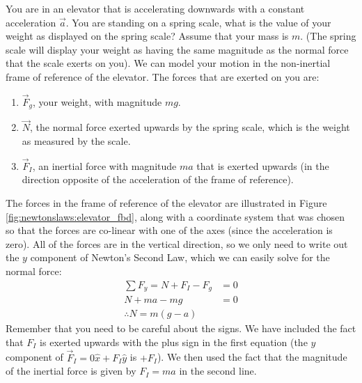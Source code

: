 \begin{example}{You are in an elevator that is accelerating downwards with a constant acceleration $\vec a$. You are standing on a spring scale, what is the value of your weight as displayed on the spring scale? Assume that your mass is $m$. (The spring scale will display your weight as having the same magnitude as the normal force that the scale exerts on you). }
We can model your motion in the non-inertial frame of reference of the elevator. The forces that are exerted on you are:
\begin{enumerate}
\item $\vec F_g$, your weight, with magnitude $mg$.
\item $\vec N$, the normal force exerted upwards by the spring scale, which is the weight as measured by the scale.
\item $\vec F_I$, an inertial force with magnitude $ma$ that is exerted upwards (in the direction opposite of the acceleration of the frame of reference).
\end{enumerate}
The forces in the frame of reference of the elevator are illustrated in Figure \ref{fig:newtonslaws:elevator_fbd}, along with a coordinate system that was chosen so that the forces are co-linear with one of the axes (since the acceleration is zero).
All of the forces are in the vertical direction, so we only need to write out the $y$ component of Newton's Second Law, which we can easily solve for the normal force:
\begin{align*}
\sum F_y = N+F_I-F_g &=0\\
N + ma -mg &=0\\
\therefore N=m(g-a)
\end{align*}
Remember that you need to be careful about the signs. We have included the fact that $F_I$ is exerted upwards with the plus sign in the first equation (the $y$ component of $\vec F_I=0\hat x+F_I\hat y$ is $+F_I$). We then used the fact that the magnitude of the inertial force is given by $F_I=ma$ in the second line.


\end{example}
